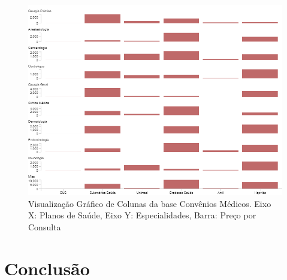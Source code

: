 \documentclass[
	12pt,				%
	openright,			%
	twoside,			%
	a4paper,			%
	english,			%
	brazil				%
	]{abntex2}
\begin{document}
	\begin{figure}[h!]
		\centering
		\includegraphics[width=\linewidth]{./figures/Resultados/BCCM.png}
		\caption{Visualização Gráfico de Colunas da base Convênios Médicos. Eixo X: Planos de Saúde, Eixo Y: Especialidades, Barra: Preço por Consulta}
		\label{fig:BCCM}
	\end{figure}
	

\chapter{Conclusão}

\lipsum[31-33]

\postextual


\end{document}

